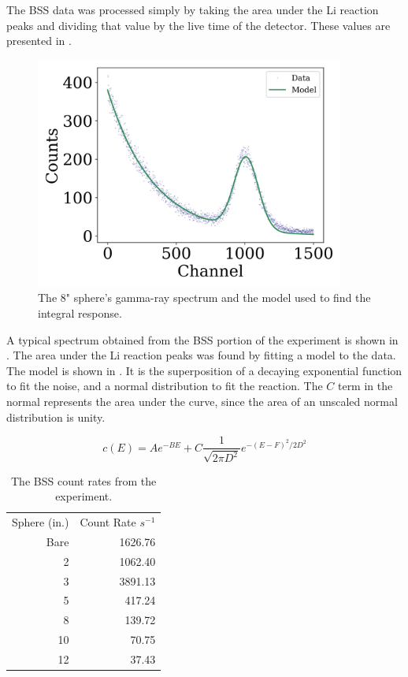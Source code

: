 The BSS data was processed simply by taking the area under the Li reaction peaks and dividing that value by the live time of the detector.
These values are presented in .

\begin{figure}[htb]
\centering
\includegraphics[height=3in]{tex/figures/bs4_spectrum.png}
\caption[8" BSS Spectrum]{The 8" sphere's gamma-ray spectrum and the model used to find the integral response.}
\label{fig:bs4_spectrum}
\end{figure}

A typical spectrum obtained from the BSS portion of the experiment is shown in .
The area under the Li reaction peaks was found by fitting a model to the data.
The model is shown in .
It is the superposition of a decaying exponential function to fit the noise, and a normal distribution to fit the reaction.
The $C$ term in the normal represents the area under the curve, since the area of an unscaled normal distribution is unity.

\begin{equation}
\label{eqn:model}
c(E) = A e^{-BE} + C \frac{1}{\sqrt{2 \pi D^2}} e^{-(E - F)^2 / 2 D^2}
\end{equation}


\begin{table}[h]\centering
\label{tab:bss}
\caption{The BSS count rates from the experiment.}
\begin{tabular}{ r | r }
\toprule
Sphere (in.)  & Count Rate $s^{-1}$\\
Bare & 1626.76\\
2  & 1062.40\\
3 & 3891.13\\
5 & 417.24\\
8 & 139.72\\
10 & 70.75\\
12 & 37.43\\
\end{tabular}
\end{table}

